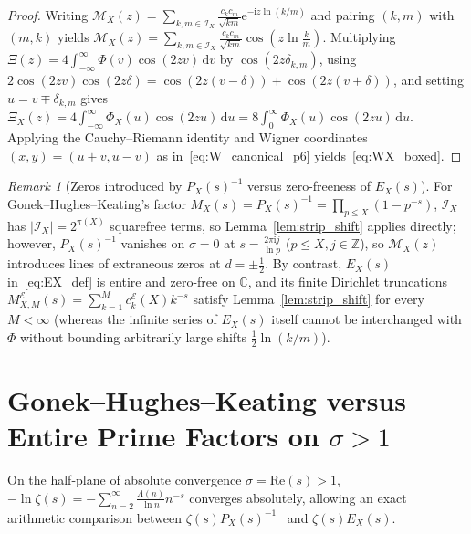 \documentclass[11pt,reqno]{amsart}
\theoremstyle{definition}
\theoremstyle{remark}
\newtheorem{remark}[theorem]{Remark}
\numberwithin{equation}{section}
\newcommand{\C}{\mathbb{C}}
\newcommand{\Z}{\mathbb{Z}}
\newcommand{\dd}{\mathrm{d}}
\newcommand{\ii}{\mathrm{i}}
\newcommand{\ee}{\mathrm{e}}
\newcommand{\Rea}{\mathrm{Re}}
\begin{document}
\begin{proof}\sloppy
Writing $\mathcal{M}_X(z) = \sum_{k,m \in \mathcal{I}_X} \frac{c_k c_m}{\sqrt{km}}\ee^{-\ii z\ln(k/m)}$ and pairing $(k,m)$ with $(m,k)$ yields $\mathcal{M}_X(z) = \sum_{k,m \in \mathcal{I}_X} \frac{c_k c_m}{\sqrt{km}}\cos(z\ln\frac{k}{m})$. Multiplying $\Xi(z) = 4\int_{-\infty}^{\infty} \Phi(v)\cos(2zv)\,\dd v$ by $\cos(2z\delta_{k,m})$, using $2\cos(2zv)\cos(2z\delta) = \cos(2z(v-\delta)) + \cos(2z(v+\delta))$, and setting $u = v \mp \delta_{k,m}$ gives $\Xi_X(z) = 4\int_{-\infty}^{\infty} \Phi_X(u)\cos(2zu)\,\dd u = 8\int_0^{\infty} \Phi_X(u)\cos(2zu)\,\dd u$. Applying the Cauchy--Riemann identity and Wigner coordinates $(x,y) = (u+v, u-v)$ as in~\eqref{eq:W_canonical_p6} yields~\eqref{eq:WX_boxed}.
\end{proof}

\begin{remark}[Zeros introduced by $P_X(s)^{-1}$ versus zero-freeness of $E_X(s)$]\label{rem:zeros_PX}
For Gonek--Hughes--Keating's factor $M_X(s) = P_X(s)^{-1} = \prod_{p \le X}(1 - p^{-s})$, $\mathcal{I}_X$ has $\lvert\mathcal{I}_X\rvert = 2^{\pi(X)}$ squarefree terms, so Lemma~\ref{lem:strip_shift} applies directly; however, $P_X(s)^{-1}$ vanishes on $\sigma = 0$ at $s = \frac{2\pi\ii j}{\ln p}$ ($p \le X, j \in \Z$), so $\mathcal{M}_X(z)$ introduces lines of extraneous zeros at $d = \pm\frac{1}{2}$. By contrast, $E_X(s)$ in~\eqref{eq:EX_def} is entire and zero-free on $\C$, and its finite Dirichlet truncations $M_{X,M}^{\mathcal{E}}(s) = \sum_{k=1}^M c_k^{\mathcal{E}}(X)k^{-s}$ satisfy Lemma~\ref{lem:strip_shift} for every $M < \infty$ (whereas the infinite series of $E_X(s)$ itself cannot be interchanged with $\Phi$ without bounding arbitrarily large shifts $\frac{1}{2}\ln(k/m)$).
\end{remark}

\section{Gonek--Hughes--Keating versus Entire Prime Factors on $\sigma > 1$}\label{sec:purity}

On the half-plane of absolute convergence $\sigma = \Rea(s) > 1$, $-\ln\zeta(s) = -\sum_{n=2}^{\infty} \frac{\Lambda(n)}{\ln n}n^{-s}$ converges absolutely, allowing an exact arithmetic comparison between $\zeta(s)P_X(s)^{-1}$~\cite{gonekhugheskeating2007} and $\zeta(s)E_X(s)$.
\end{document}
